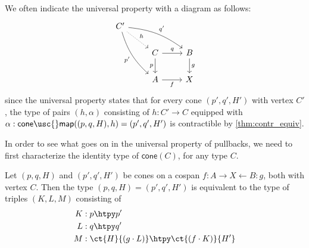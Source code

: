 We often indicate the universal property with a diagram as follows:
\begin{equation*}
\begin{tikzcd}
C' \arrow[drr,bend left=15,"{q'}"] \arrow[dr,densely dotted,"h"] \arrow[ddr,bend right=15,swap,"{p'}"] \\
& C \arrow[r,"q"] \arrow[d,swap,"p"] & B \arrow[d,"g"] \\
& A \arrow[r,swap,"f"] & X
\end{tikzcd}
\end{equation*}
since the universal property states that for every cone $(p',q',H')$ with vertex $C'$, the type of pairs $(h,\alpha)$ consisting of $h:C'\to C$ equipped with $\alpha:\mathsf{cone\usc{}map}((p,q,H),h)=(p',q',H')$ is contractible by \cref{thm:contr_equiv}.

In order to see what goes on in the universal property of pullbacks, we need to first characterize the identity type of $\mathsf{cone}(C)$, for any type $C$.

\begin{lem}\label{lem:id_cone}
Let $(p,q,H)$ and $(p',q',H')$ be cones on a cospan $f:A\rightarrow X \leftarrow B:g$, both with vertex $C$. Then the type $(p,q,H)=(p',q',H')$ is equivalent to the type of triples $(K,L,M)$ consisting of
\begin{align*}
K & : p \htpy p' \\
L & : q \htpy q' \\
M & : \ct{H}{(g\cdot L)} \htpy \ct{(f\cdot K)}{H'}
\end{align*}
\end{lem}

